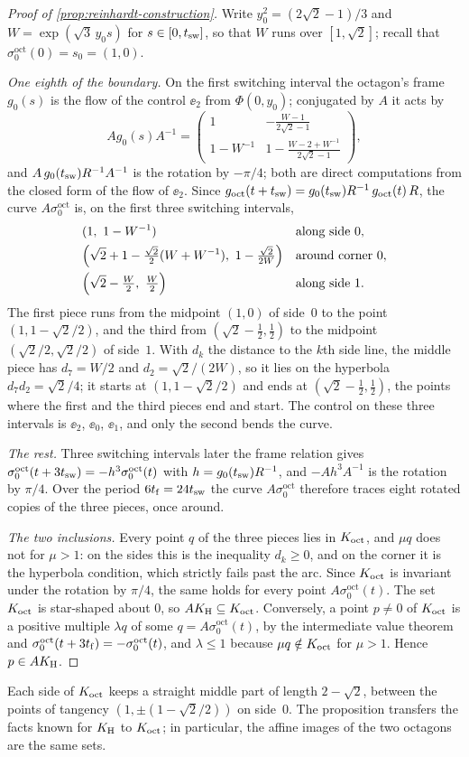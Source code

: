 \begin{proof}[Proof of \cref{prop:reinhardt-construction}]
Write $y_0^2=(2\sqrt2-1)/3$ and $W=\exp(\sqrt3\,y_0 s)$ for $s\in[0,t_{\mathrm{sw}}]$, so that $W$ runs over
$[1,\sqrt2]$; recall that $\sigma^{\mathrm{oct}}_0(0)=s_0=(1,0)$.

\emph{One eighth of the boundary.} On the first switching interval the octagon's frame
$g_0(s)$ is the flow of the control $\ee_2$ from $\Phi(0,y_0)$; conjugated by $A$ it acts by
\[
 Ag_0(s)A^{-1}=\begin{pmatrix}1&-\frac{W-1}{2\sqrt2-1}\\[0.5ex]
 1-W^{-1}&1-\frac{W-2+W^{-1}}{2\sqrt2-1}\end{pmatrix},
\]
and $A\,g_0(t_{\mathrm{sw}})R^{-1}A^{-1}$ is the rotation by $-\pi/4$; both are direct computations from
the closed form of the flow of $\ee_2$. Since $g_{\mathrm{oct}}(t+t_{\mathrm{sw}})=g_0(t_{\mathrm{sw}})R^{-1}\,g_{\mathrm{oct}}(t)\,R$,
the curve $A\sigma^{\mathrm{oct}}_0$ is, on the first three switching intervals,
\begin{align*}
 &(1,\ 1-W^{-1}) &&\text{along side $0$},\\
 &\Bigl(\sqrt2+1-\tfrac{\sqrt2}{2}(W+W^{-1}),\ 1-\tfrac{\sqrt2}{2W}\Bigr)
  &&\text{around corner $0$},\\
 &\Bigl(\sqrt2-\tfrac W2,\ \tfrac W2\Bigr) &&\text{along side $1$}.
\end{align*}
The first piece runs from the midpoint $(1,0)$ of side~$0$ to the point $(1,1-\sqrt2/2)$, and the
third from $(\sqrt2-\tfrac12,\tfrac12)$ to the midpoint $(\sqrt2/2,\sqrt2/2)$ of side~$1$.
With $d_k$ the distance to the $k$th side line, the middle piece has $d_7=W/2$ and
$d_2=\sqrt2/(2W)$, so it lies on the hyperbola $d_7d_2=\sqrt2/4$; it starts at
$(1,1-\sqrt2/2)$ and ends at $(\sqrt2-\tfrac12,\tfrac12)$, the points where the first and the
third pieces end and start. The control on these three intervals is $\ee_2$, $\ee_0$, $\ee_1$,
and only the second bends the curve.

\emph{The rest.} Three switching intervals later the frame relation gives
$\sigma^{\mathrm{oct}}_0(t+3t_{\mathrm{sw}})=-h^3\sigma^{\mathrm{oct}}_0(t)$ with $h=g_0(t_{\mathrm{sw}})R^{-1}$, and
$-Ah^3A^{-1}$ is the rotation by $\pi/4$. Over the period
$6t_{\mathrm{f}}=24t_{\mathrm{sw}}$ the curve $A\sigma^{\mathrm{oct}}_0$ therefore traces eight rotated copies of the
three pieces, once around.

\emph{The two inclusions.} Every point $q$ of the three pieces lies in $K_{\mathrm{oct}}$, and $\mu q$ does
not for $\mu>1$: on the sides this is the inequality $d_k\ge0$, and on the corner it is the
hyperbola condition, which strictly fails past the arc. Since $K_{\mathrm{oct}}$ is invariant under the
rotation by $\pi/4$, the same holds for every point $A\sigma^{\mathrm{oct}}_0(t)$. The set $K_{\mathrm{oct}}$ is star-shaped about $0$, so $AK_{\mathrm{H}}\subseteq K_{\mathrm{oct}}$.
Conversely, a point $p\ne0$ of $K_{\mathrm{oct}}$ is a positive multiple $\lambda q$ of some
$q=A\sigma^{\mathrm{oct}}_0(t)$, by the intermediate value theorem and
$\sigma^{\mathrm{oct}}_0(t+3t_{\mathrm{f}})=-\sigma^{\mathrm{oct}}_0(t)$, and $\lambda\le1$ because
$\mu q\notin K_{\mathrm{oct}}$ for $\mu>1$. Hence $p\in AK_{\mathrm{H}}$.
\end{proof}

Each side of $K_{\mathrm{oct}}$ keeps a straight middle part of length $2-\sqrt2$, between the points of
tangency $(1,\pm(1-\sqrt2/2))$ on side~$0$. The proposition transfers the facts known for $K_{\mathrm{H}}$ to
$K_{\mathrm{oct}}$; in particular, the affine images of the two octagons are the same sets.
